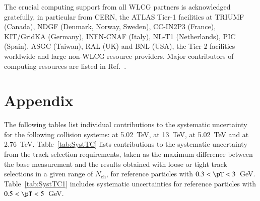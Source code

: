 \documentclass[cernpreprint,texlive=2014,txfonts,UKenglish]{latex/atlasdoc}
\begin{document}
The crucial computing support from all WLCG partners is acknowledged gratefully, in particular from CERN, the ATLAS Tier-1 facilities at TRIUMF (Canada), NDGF (Denmark, Norway, Sweden), CC-IN2P3 (France), KIT/GridKA (Germany), INFN-CNAF (Italy), NL-T1 (Netherlands), PIC (Spain), ASGC (Taiwan), RAL (UK) and BNL (USA), the Tier-2 facilities worldwide and large non-WLCG resource providers. Major contributors of computing resources are listed in Ref.~\cite{ATL-GEN-PUB-2016-002}.

\clearpage
\appendix
\part*{Appendix}
The following tables list individual contributions to the systematic uncertainty for the following collision systems:   \pp  at 5.02~TeV, \pp at 13~TeV, \pPb at 5.02~TeV and \PbPb at 2.76~TeV. 
 Table~\ref{tab:SystTC} lists contributions to the systematic uncertainty from the track selection requirements, taken as the maximum difference between the base measurement and the results obtained with loose or tight track selections in a given range of $N_{\mathrm{ch}}$, for reference particles with  $0.3 < \pT < 3$~GeV. Table~\ref{tab:SystTC1} includes systematic uncertainties for reference particles with $0.5 < \pT < 5$~GeV.
\end{document}
